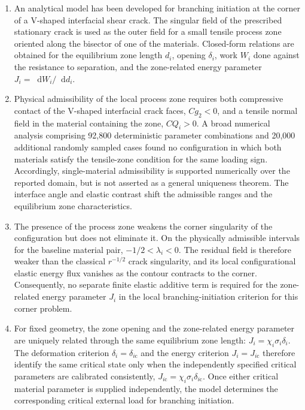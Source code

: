 \documentclass[pdflatex,onecolumn,sn-mathphys-ay]{sn-jnl}
\newcommand{\dd}{\mathop{}\!\mathrm{d}}
\begin{document}
\begin{enumerate}
\item
An analytical model has been developed for branching initiation at the
corner of a V-shaped interfacial shear crack. The singular field of the
prescribed stationary crack is used as the outer field for a small tensile
process zone oriented along the bisector of one of the materials.
Closed-form relations are obtained for the equilibrium zone length $d_i$,
opening $\delta_i$, work $W_i$ done against the resistance to separation,
and the zone-related energy parameter $J_i=\dd W_i/\dd d_i$.

\item
Physical admissibility of the local process zone requires both compressive
contact of the V-shaped interfacial crack faces, $Cg_2<0$, and a tensile
normal field in the material containing the zone, $CQ_i>0$. A broad
numerical analysis comprising 92,800 deterministic parameter combinations and
20,000 additional randomly sampled cases found no configuration in which
both materials satisfy the tensile-zone condition for the same loading sign.
Accordingly, single-material admissibility is supported numerically over the
reported domain, but is not asserted as a general uniqueness theorem. The
interface angle and elastic contrast shift the admissible ranges and the
equilibrium zone characteristics.

\item
The presence of the process zone weakens the corner singularity of the
configuration but does not eliminate it. On the physically admissible intervals for the baseline
material pair, $-1/2<\lambda_i<0$. The residual field is therefore weaker
than the classical $r^{-1/2}$ crack singularity, and its local
configurational elastic energy flux vanishes as the contour contracts to
the corner. Consequently, no separate finite elastic additive term is required for the
zone-related energy parameter $J_i$ in the local branching-initiation
criterion for this corner problem.

\item
For fixed geometry, the zone opening and the zone-related energy parameter
are uniquely related through the same equilibrium zone length:
$J_i=\chi_i\sigma_i\delta_i$. The deformation criterion
$\delta_i=\delta_{i\mathrm{c}}$ and the energy criterion
$J_i=J_{i\mathrm{c}}$ therefore identify the same critical state only
when the independently specified critical parameters are calibrated
consistently,
$J_{i\mathrm{c}}=\chi_i\sigma_i\delta_{i\mathrm{c}}$. Once either
critical material parameter is supplied independently, the model determines
the corresponding critical external load for branching initiation.


\end{enumerate}
\end{document}
